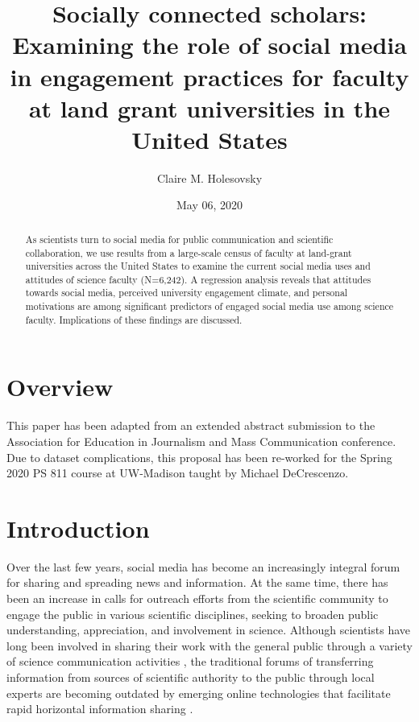\documentclass[12pt,]{article}
\title{Socially connected scholars: Examining the role of social media in engagement practices for faculty at land grant universities in the United States}
\author{Claire M. Holesovsky}
\date{May 06, 2020}
\begin{document}
\maketitle
\begin{abstract}
As scientists turn to social media for public communication and scientific collaboration, we use results from a large-scale census of faculty at land-grant universities across the United States to examine the current social media uses and attitudes of science faculty (N=6,242). A regression analysis reveals that attitudes towards social media, perceived university engagement climate, and personal motivations are among significant predictors of engaged social media use among science faculty. Implications of these findings are discussed.
\end{abstract}

{
\hypersetup{linkcolor=}
\setcounter{tocdepth}{2}
\tableofcontents
}
\hypertarget{overview}{%
\section{Overview}\label{overview}}

This paper has been adapted from an extended abstract submission to the Association for Education in Journalism and Mass Communication conference. Due to dataset complications, this proposal has been re-worked for the Spring 2020 PS 811 course at UW-Madison taught by Michael DeCrescenzo.

\hypertarget{introduction}{%
\section{Introduction}\label{introduction}}

Over the last few years, social media has become an increasingly integral forum for sharing and spreading news and information. At the same time, there has been an increase in calls for outreach efforts from the scientific community to engage the public in various scientific disciplines, seeking to broaden public understanding, appreciation, and involvement in science. Although scientists have long been involved in sharing their work with the general public through a variety of science communication activities \autocite{rowe2005typology}, the traditional forums of transferring information from sources of scientific authority to the public through local experts are becoming outdated by emerging online technologies that facilitate rapid horizontal information sharing \autocite{keller2014mind}.
\end{document}
